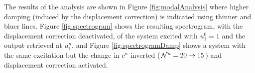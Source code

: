 The results of the analysis are shown in Figure \ref{fig:modalAnalysis} where higher damping (induced by the displacement correction) is indicated using thinner and bluer lines. Figure \ref{fig:spectrogram} shows the resulting spectrogram, with the displacement correction deactivated, of the system excited with $u_1^0 = 1$ and the output retrieved at $u_1^n$, and Figure \ref{fig:spectrogramDamp} shows a system with the same excitation but the change in $c^n$ inverted ($\mathcal{N}^n=20\rightarrow 15$) and displacement correction activated.

\begin{figure}[ht!]
    \centering
    \\
    \vspace{-1em}\\
    \vspace{-1em}

\end{figure}
